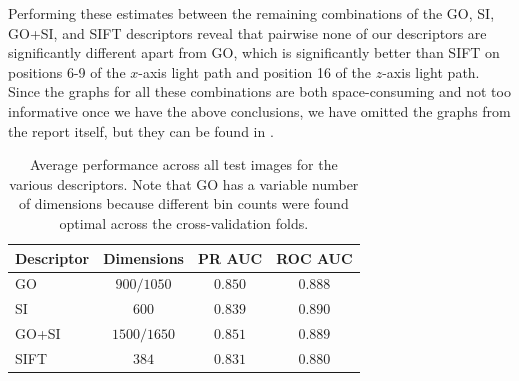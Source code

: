 \documentclass[thesis.tex]{subfiles}
\begin{document}
Performing these estimates between the remaining combinations of the GO, SI, GO+SI, and SIFT descriptors reveal that pairwise none of our descriptors are significantly different apart from GO, which is significantly better than SIFT on positions 6-9 of the $x$-axis light path and position 16 of the $z$-axis light path. Since the graphs for all these combinations are both space-consuming and not too informative once we have the above conclusions, we have omitted the graphs from the report itself, but they can be found in .
%
\begin{table}[tb]
\centering
\begin{tabular}{ l c c c }
\toprule
Descriptor & Dimensions & PR AUC & ROC AUC \\ \midrule
GO & $900/1050$ & $0.850$ & $0.888$ \\ 
SI & $600$ & $0.839$ & $0.890$ \\ 
GO+SI & $1500/1650$ & $0.851$ & $0.889$ \\ 
SIFT & $384$ & $0.831$ & $0.880$ \\ 
\bottomrule
\end{tabular}
\caption{Average performance across all test images for the various descriptors. Note that GO has a variable number of dimensions because different bin counts were found optimal across the cross-validation folds.}
\label{tbl:dtuOverallResults}
\end{table}
%
\end{document}
